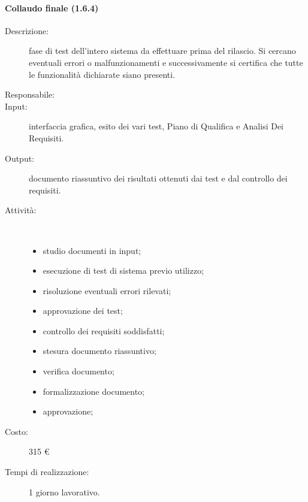 \begin{description}
\paragraph{Collaudo finale (1.6.4)}
\begin{description}
\item[Descrizione:] fase di test dell'intero sistema da effettuare prima del rilascio. Si cercano eventuali errori o malfunzionamenti e successivamente si certifica che tutte le funzionalit\`{a} dichiarate siano presenti.
\item[Responsabile:] 
\item[Input:] interfaccia grafica, esito dei vari test, Piano di Qualifica e Analisi Dei Requisiti.
\item[Output:] documento riassuntivo dei risultati ottenuti dai test e dal controllo dei requisiti.
\item[Attività:]\mbox{}\\[-1.5\baselineskip]
	\begin{itemize}
	\item studio documenti in input;
	\item esecuzione di test di sistema previo utilizzo;
	\item risoluzione eventuali errori rilevati;
	\item approvazione dei test;
	\item controllo dei requisiti soddisfatti;
	\item stesura documento riassuntivo;
	\item verifica documento;
	\item formalizzazione documento;
	\item approvazione;
	\end{itemize}
\item[Costo:] 315 \euro{}
\item[Tempi di realizzazione:] 1 giorno lavorativo.
\end{description}


\end{description}
